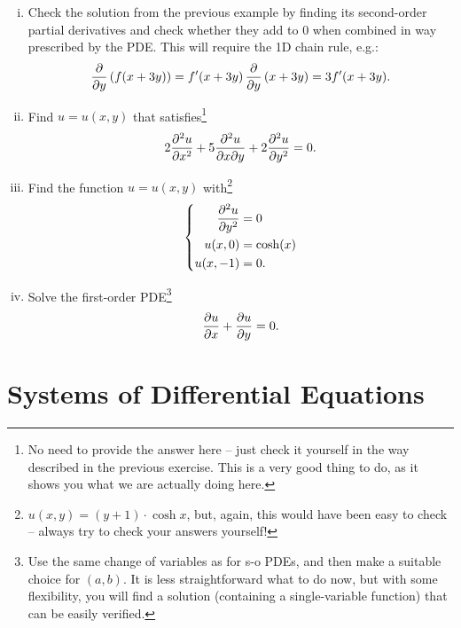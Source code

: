 \begin{exercise}
\begin{enumerate}[(i)]
	\item Check the solution from the previous example by finding its second-order partial derivatives and check whether they add to $0$ when combined in way prescribed by the PDE. This will require the 1D chain rule, e.g.:
	\[ \displaystyle{\frac{\partial }{\partial y}}\left( f(x+3y) \right) = f'(x+3y)\,\displaystyle{\frac{\partial }{\partial y}}\left( x+3y \right)
		= 3f'(x+3y).\]
	\item Find $u=u(x,y)$ that satisfies\footnote{No need to provide the answer here -- just check it yourself in the way described in the previous exercise. This is a very good thing to do, as it shows you what we are actually doing here.}
		\[ 2\displaystyle{\frac{\partial^2 u}{\partial x^2}} + 5\displaystyle{\frac{\partial^2 u}{\partial{x}\partial{y}}} +2\displaystyle{\frac{\partial^2 u}{\partial y^2}} = 0. \]
	\item Find the function $u=u(x,y)$ with\footnote{$u(x,y) = (y+1) \cdot \cosh x$, but, again, this would have been easy to check -- always try to check your answers yourself!}
	\[ \left\{ \begin{split}
\displaystyle{\frac{\partial^2 u}{\partial y^2}} & = 0 \\ u(x,0) &= \cosh(x) \\ u(x,-1) &= 0. 
	\end{split} \right. \]
	\item Solve the first-order PDE\footnote{Use the same change of variables as for s-o PDEs, and then make a suitable choice for $(a,b)$. It is less straightforward what to do now, but with some flexibility, you will find a solution (containing a single-variable function) that can be easily verified.}
	\[ \displaystyle{\frac{\partial u}{\partial x}} + \displaystyle{\frac{\partial u}{\partial y}} = 0. \]
\end{enumerate}
\end{exercise}


\section{Systems of Differential Equations}


